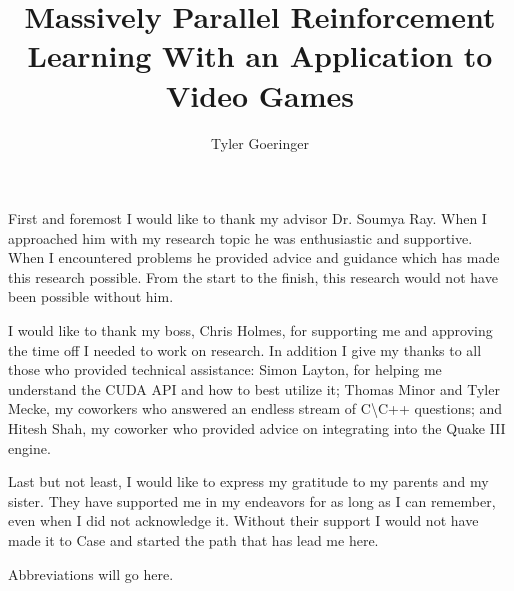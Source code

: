 \clearpage{}

\title{Massively Parallel Reinforcement Learning With an Application to Video Games}
\author{Tyler Goeringer}
\date{}
\maketitle


\committeeapprovalpage

\begin{acknowledgments}
First and foremost I would like to thank my advisor Dr. Soumya Ray. When I approached him with my research topic he was enthusiastic and supportive. When I encountered problems he provided advice and guidance which has made this research possible. From the start to the finish, this research would not have been possible without him.
    
I would like to thank my boss, Chris Holmes, for supporting me and approving the time off I needed to work on research. In addition I give my thanks to all those who provided technical assistance: Simon Layton, for helping me understand the CUDA API and how to best utilize it; Thomas Minor and Tyler Mecke, my coworkers who answered an endless stream of C\textbackslash C++ questions; and Hitesh Shah, my coworker who provided advice on integrating into the Quake III engine.

Last but not least, I would like to express my gratitude to my parents and my sister. They have supported me in my endeavors for as long as I can remember, even when I did not acknowledge it. Without their support I would not have made it to Case and started the path that has lead me here.
\end{acknowledgments}

\tableofcontents
\listoftables
\listoffigures

\begin{abbreviations}
    Abbreviations will go here.
\end{abbreviations}

